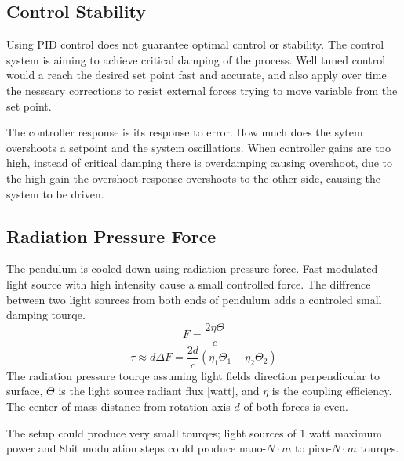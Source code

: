 \documentclass[\main/master.tex]{subfiles}
\begin{document}
\subsection{Control Stability}
Using PID control does not guarantee optimal control or stability. The control system is aiming to achieve critical damping of the process. Well tuned control would a reach the desired set point fast and accurate, and also apply over time the nesseary corrections to resist external forces trying to move variable from the set point.
\par
The controller response is its response to error. How much does the sytem overshoots a setpoint and the system oscillations. When controller gains are too high, instead of critical damping there is overdamping causing overshoot, due to the high gain the overshoot response overshoots to the other side, causing the system to be driven.
\subsection{Radiation Pressure Force}
The pendulum is cooled down using radiation pressure force. Fast modulated light source with high intensity cause a small controlled force. The diffrence between two light sources from both ends of pendulum adds a controled small damping tourqe. 
\begin{equation}
F = \frac{2\eta\Theta}{{c}} \label{eqn:radiation force}
\end{equation}
\begin{equation}
\tau\approx d\Delta F = \frac{2d}{{c}} (\eta_1\Theta_1 -\eta_2\Theta_2) \label{eqn:radiation tourqe}
\end{equation}
The radiation pressure tourqe assuming light fields direction perpendicular to surface, $\Theta$ is the light source radiant flux [watt], and $\eta$ is the coupling efficiency. The center of mass distance from rotation axis $d$ of both forces is even.
\par
The setup could produce very small tourqes; light sources of 1 watt maximum power and 8bit modulation steps could produce nano-$N\cdot m$ to pico-$N\cdot m$ tourqes. 
\end{document}
